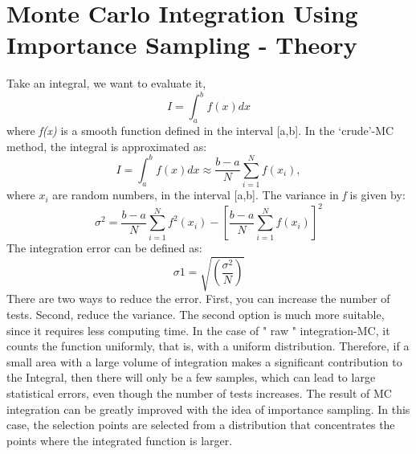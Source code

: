 \documentclass{article}
\begin{document}
\section{Monte Carlo Integration Using Importance Sampling - Theory}
Take an integral, we want to evaluate it, 
\newline
    \begin{equation}\label{eq:fourierrow}
        I=\int_{a}^{b}f(x)dx
    \end{equation}
\newline
where \textit{f(x)} is a smooth function defined in the interval [a,b]. In the ‘crude’-MC method, the integral is approximated as:
\newline
    \begin{equation}\label{eq:fourierrow}
        I=\int_{a}^{b}f(x)dx \approx \frac{b-a}{N}\sum_{i=1}^{N}f(x_{i}),
    \end{equation}
\newline
where ${x_{i}}$ are random numbers, in the interval [a,b]. The variance in \textit{f} is given by:
\newline
    \begin{equation}\label{eq:fourierrow}
        \sigma ^2 = \frac{b-a}{N}\sum_{i=1}^{N}f^2(x_{i})-[\frac{b-a}{N}\sum_{i=1}^{N}f(x_{i})]^2
    \end{equation}
\newline
The integration error can be defined as:
\newline
    \begin{equation}\label{eq:fourierrow}
        \sigma1= \sqrt{(\frac{\sigma^2}{N})}
    \end{equation}
\newline
There are two ways to reduce the error. First, you can increase the number of tests. Second, reduce the variance. The second option is much more suitable, since it requires less computing time. In the case of " raw " integration-MC, it counts the function uniformly, that is, with a uniform distribution. Therefore, if a small area with a large volume of integration makes a significant contribution to the Integral, then there will only be a few samples, which can lead to large statistical errors, even though the number of tests increases. The result of MC integration can be greatly improved with the idea of importance sampling. In this case, the selection points are selected from a distribution that concentrates the points where the integrated function is larger.
\newline
\newline
\end{document}
